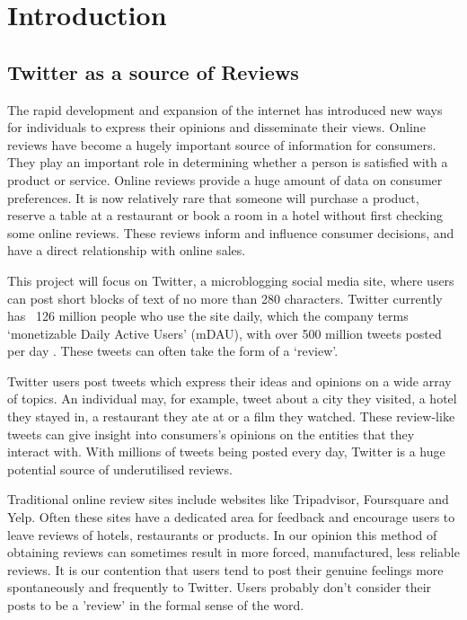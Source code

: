 
\chapter{Introduction}

\section{Twitter as a source of Reviews}
The rapid development and expansion of the internet has introduced new ways for individuals to express their opinions and disseminate their views. Online reviews have become a hugely important source of information for consumers. They play an important role in determining whether a person is satisfied with a product or service. Online reviews provide a huge amount of data on consumer preferences. It is now relatively rare that someone will purchase a product, reserve a table at a restaurant or book a room in a hotel without first checking some online reviews. These reviews inform and influence consumer decisions, and have a direct relationship with online sales. 

This project will focus on Twitter, a microblogging social media site, where users can post short blocks of text of no more than 280 characters. Twitter currently has ~126 million people who use the site daily, which the company terms `monetizable Daily Active Users' (mDAU), with over 500 million tweets posted per day \cite{Twitter2019}. These tweets can often take the form of a `review'.

Twitter users post tweets which express their ideas and opinions on a wide array of topics. An individual may, for example, tweet about a city they visited, a hotel they stayed in, a restaurant they ate at or a film they watched. These review-like tweets can give insight into consumers’s opinions on the entities that they interact with. With millions of tweets being posted every day, Twitter is a huge potential source of underutilised reviews.

Traditional online review sites include websites like Tripadvisor, Foursquare and Yelp. Often these sites have a dedicated area for feedback and encourage users to leave reviews of hotels, restaurants or products. In our opinion this method of obtaining reviews can sometimes result in more forced, manufactured, less reliable reviews. It is our contention that users tend to post their genuine feelings more spontaneously and frequently to Twitter. Users probably don't consider their posts to be a 'review' in the formal sense of the word.

